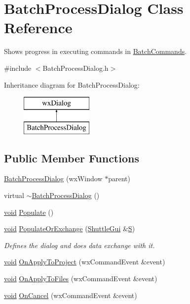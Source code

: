 \hypertarget{class_batch_process_dialog}{}\section{Batch\+Process\+Dialog Class Reference}
\label{class_batch_process_dialog}


Shows progress in executing commands in \hyperlink{class_batch_commands}{Batch\+Commands}.  




{\ttfamily \#include $<$Batch\+Process\+Dialog.\+h$>$}

Inheritance diagram for Batch\+Process\+Dialog\+:\begin{figure}[H]
\begin{center}
\leavevmode
\includegraphics[height=2.000000cm]{class_batch_process_dialog}
\end{center}
\end{figure}
\subsection*{Public Member Functions}
\begin{DoxyCompactItemize}
\item 
\hyperlink{class_batch_process_dialog_a7da4f0938aa600fbef79039a13fb235a}{Batch\+Process\+Dialog} (wx\+Window $\ast$parent)
\item 
virtual \hyperlink{class_batch_process_dialog_a175a01380945f9eac66137108222eaba}{$\sim$\+Batch\+Process\+Dialog} ()
\item 
\hyperlink{sound_8c_ae35f5844602719cf66324f4de2a658b3}{void} \hyperlink{class_batch_process_dialog_aa48ae76296712a3cd88a60ca09d90c60}{Populate} ()
\item 
\hyperlink{sound_8c_ae35f5844602719cf66324f4de2a658b3}{void} \hyperlink{class_batch_process_dialog_a19b279fcee1026c25ad85ce332c340a3}{Populate\+Or\+Exchange} (\hyperlink{class_shuttle_gui}{Shuttle\+Gui} \&\hyperlink{xlftab_8c_af933676109efed7ab34cea71d748a517}{S})
\begin{DoxyCompactList}\small\item\em Defines the dialog and does data exchange with it. \end{DoxyCompactList}\item 
\hyperlink{sound_8c_ae35f5844602719cf66324f4de2a658b3}{void} \hyperlink{class_batch_process_dialog_a05662b0d59f223e0ff81ef26cb0c48a4}{On\+Apply\+To\+Project} (wx\+Command\+Event \&event)
\item 
\hyperlink{sound_8c_ae35f5844602719cf66324f4de2a658b3}{void} \hyperlink{class_batch_process_dialog_aa158231f3dc8dd0211927769a2c6a12f}{On\+Apply\+To\+Files} (wx\+Command\+Event \&event)
\item 
\hyperlink{sound_8c_ae35f5844602719cf66324f4de2a658b3}{void} \hyperlink{class_batch_process_dialog_a378bdf0fe39651ae04d461ccf3303375}{On\+Cancel} (wx\+Command\+Event \&event)
\end{DoxyCompactItemize}
